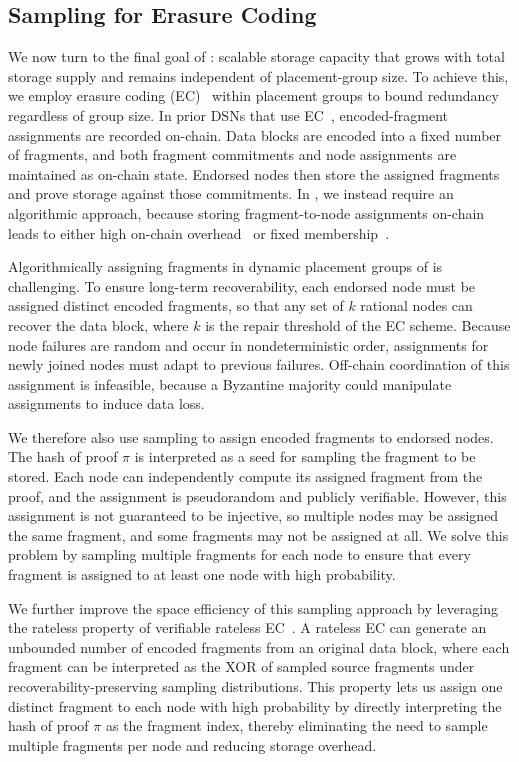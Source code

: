 \subsection{Sampling for Erasure Coding}
\label{sec:approach:ec}

We now turn to the final goal of \sys{}: scalable storage capacity that grows with total storage supply and remains independent of placement-group size.
To achieve this, we employ erasure coding (EC)~\cite{rs-code} within placement groups to bound redundancy regardless of group size.
In prior DSNs that use EC~\cite{filecoin,sia,shelby,walrus}, encoded-fragment assignments are recorded on-chain.
Data blocks are encoded into a fixed number of fragments, and both fragment commitments and node assignments are maintained as on-chain state.
Endorsed nodes then store the assigned fragments and prove storage against those commitments.
In \sys, we instead require an algorithmic approach, because storing fragment-to-node assignments on-chain leads to either high on-chain overhead~\cite{filecoin,sia,shelby} or fixed membership~\cite{walrus}.

Algorithmically assigning fragments in dynamic placement groups of \sys is challenging.
To ensure long-term recoverability, each endorsed node must be assigned distinct encoded fragments, so that any set of $k$ rational nodes can recover the data block, where $k$ is the repair threshold of the EC scheme.
Because node failures are random and occur in nondeterministic order, assignments for newly joined nodes must adapt to previous failures.
Off-chain coordination of this assignment is infeasible, because a Byzantine majority could manipulate assignments to induce data loss.

We therefore also use sampling to assign encoded fragments to endorsed nodes.
The hash of proof $\pi$ is interpreted as a seed for sampling the fragment to be stored.
Each node can independently compute its assigned fragment from the proof, and the assignment is pseudorandom and publicly verifiable.
However, this assignment is not guaranteed to be injective, so multiple nodes may be assigned the same fragment, and some fragments may not be assigned at all.
We solve this problem by sampling multiple fragments for each node to ensure that every fragment is assigned to at least one node with high probability.

We further improve the space efficiency of this sampling approach by leveraging the rateless property of verifiable rateless EC~\cite{verify-rateless-ec}.
A rateless EC can generate an unbounded number of encoded fragments from an original data block, where each fragment can be interpreted as the XOR of sampled source fragments under recoverability-preserving sampling distributions.
This property lets us assign one distinct fragment to each node with high probability by directly interpreting the hash of proof $\pi$ as the fragment index, thereby eliminating the need to sample multiple fragments per node and reducing storage overhead.

